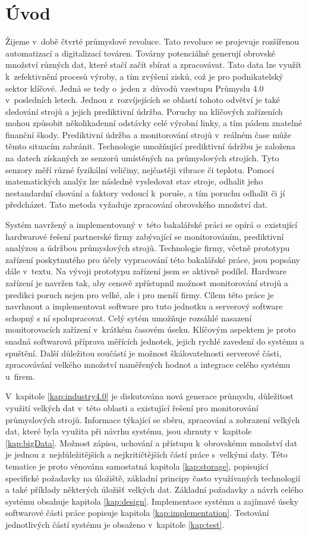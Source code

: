 \chapter{Úvod}
Žijeme v~době čtvrté průmyslové revoluce. Tato revoluce se projevuje rozšířenou automatizací a digitalizací továren. Továrny potenciálně generují obrovské množství různých dat, které stačí začít sbírat a zpracovávat. Tato data lze využít k~zefektivnění procesů výroby, a tím zvýšení zisků, což je pro podnikatelský sektor klíčové. Jedná se tedy o~jeden z~důvodů vzestupu Průmyslu 4.0 v~posledních letech. Jednou z~rozvíjejících se oblastí tohoto odvětví je také sledování strojů a jejich prediktivní údržba. Poruchy na klíčových zařízeních mohou způsobit několikadenní odstávky celé výrobní linky, a tím pádem znatelné finanční škody. Prediktivní údržba a monitorování strojů v~reálném čase může těmto situacím zabránit. Technologie umožňující prediktivní údržbu je založena na datech získaných ze senzorů umístěných na průmyslových strojích. Tyto senzory měří různé fyzikální veličiny, nejčastěji vibrace či teplotu. Pomocí matematických analýz lze následně vysledovat stav stroje, odhalit jeho nestandardní chování a faktory vedoucí k~poruše, a tím poruchu odhalit či jí předcházet. Tato metoda vyžaduje zpracování obrovského množství dat.

Systém navržený a implementovaný v~této bakalářské práci se opírá o~existující hardwarové řešení partnerské firmy zabývající se monitorováním, prediktivní analýzou a údržbou průmyslových strojů. Technologie firmy, včetně prototypu zařízení poskytnutého pro účely vypracování této bakalářské práce, jsou popsány dále v~textu. Na vývoji prototypu zařízení jsem se aktivně podílel. Hardware zařízení je navržen tak, aby cenově zpřístupnil možnost monitorování strojů a predikci poruch nejen pro velké, ale i pro menší firmy. Cílem této práce je navrhnout a implementovat software pro tuto jednotku a serverový software schopný s ní spolupracovat. Celý sytém umožňuje rozsáhlé nasazení monitorovacích zařízení v~krátkém časovém úseku. Klíčovým aspektem je proto snadná softwarová příprava měřících jednotek, jejich rychlé zavedení do systému a spuštění. Další důležitou součástí je možnost škálovatelnosti serverové části, zpracovávání velkého množství naměřených hodnot a integrace celého systému u~firem. 

V~kapitole \ref{kap:industry4.0} je diskutována nová generace průmyslu, důležitost využití velkých dat v~této oblasti a existující řešení pro monitorování průmyslových strojů. Informace týkající se sběru, zpracování a zobrazení velkých dat, které byla využita při návrhu systému, jsou shrnuty v~kapitole \ref{kap:bigData}. Možnost zápisu, uchování a přístupu k~obrovskému množství dat je jednou z~nejdůležitějších a nejkritičtějších částí práce s~velkými daty. Této tematice je proto věnována samostatná kapitola \ref{kap:storage}, popisující specifické požadavky na úložiště, základní principy často využívaných technologií a také příklady některých úložišť velkých dat. Základní požadavky a návrh celého systému obsahuje kapitola \ref{kap:design}. Implementace systému a zajímavé úseky softwarové části práce popisuje kapitola \ref{kap:implementation}. Testování jednotlivých částí systému je obsaženo v~kapitole \ref{kap:test}.